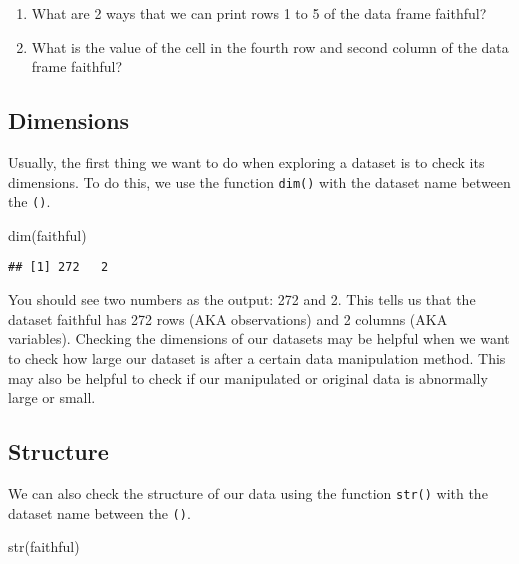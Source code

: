\documentclass[
]{book}
\newenvironment{Shaded}{\begin{snugshade}}{\end{snugshade}}
\newcommand{\FunctionTok}[1]{\textcolor[rgb]{0.00,0.00,0.00}{#1}}
\newcommand{\NormalTok}[1]{#1}
\providecommand{\tightlist}{%
  \setlength{\itemsep}{0pt}\setlength{\parskip}{0pt}}
\begin{document}
\begin{enumerate}
\def\labelenumi{\arabic{enumi}.}
\tightlist
\item
  What are 2 ways that we can print rows 1 to 5 of the data frame faithful?
\item
  What is the value of the cell in the fourth row and second column of the data frame faithful?
\end{enumerate}

\hypertarget{dimensions}{%
\subsection{Dimensions}\label{dimensions}}

Usually, the first thing we want to do when exploring a dataset is to check its dimensions. To do this, we use the function \texttt{dim()} with the dataset name between the \texttt{()}.

\begin{Shaded}
\begin{Highlighting}[]
\FunctionTok{dim}\NormalTok{(faithful)}
\end{Highlighting}
\end{Shaded}

\begin{verbatim}
## [1] 272   2
\end{verbatim}

You should see two numbers as the output: 272 and 2. This tells us that the dataset faithful has 272 rows (AKA observations) and 2 columns (AKA variables). Checking the dimensions of our datasets may be helpful when we want to check how large our dataset is after a certain data manipulation method. This may also be helpful to check if our manipulated or original data is abnormally large or small.

\hypertarget{structure}{%
\subsection{Structure}\label{structure}}

We can also check the structure of our data using the function \texttt{str()} with the dataset name between the \texttt{()}.

\begin{Shaded}
\begin{Highlighting}[]
\FunctionTok{str}\NormalTok{(faithful)}
\end{Highlighting}
\end{Shaded}
\end{document}
